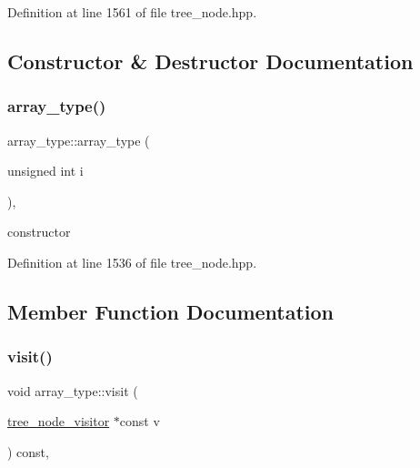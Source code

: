 Definition at line 1561 of file tree\+\_\+node.\+hpp.



\subsection{Constructor \& Destructor Documentation}
\mbox{\label{structarray__type_a79df06bd04131d5f89a8e4d9c240e05b}} 
\subsubsection{\texorpdfstring{array\+\_\+type()}{array\_type()}}
{\footnotesize\ttfamily array\+\_\+type\+::array\+\_\+type (\begin{DoxyParamCaption}\item[{unsigned int}]{i }\end{DoxyParamCaption})\hspace{0.3cm}{\ttfamily [inline]}, {\ttfamily [explicit]}}



constructor 



Definition at line 1536 of file tree\+\_\+node.\+hpp.



\subsection{Member Function Documentation}
\mbox{\label{structarray__type_af389e234db3595ab54f93b6656600756}} 
\subsubsection{\texorpdfstring{visit()}{visit()}}
{\footnotesize\ttfamily void array\+\_\+type\+::visit (\begin{DoxyParamCaption}\item[{\hyperlink{classtree__node__visitor}{tree\+\_\+node\+\_\+visitor} $\ast$const}]{v }\end{DoxyParamCaption}) const\hspace{0.3cm}{\ttfamily [override]}, {\ttfamily [virtual]}}



